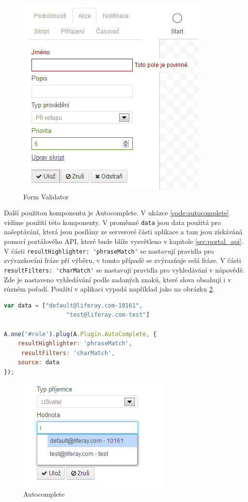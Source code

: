 \documentclass{fithesis}
\begin{document}
\begin{figure}[htp]
\centering
\includegraphics{images/validator.png}
\caption{Form Validator}
\label{fig:validator}
\end{figure}

Další použitou komponentu  je Autocomplete. V ukázce \ref{code:autocomplete} vidíme použití této komponenty. V proměnné \verb|data| jsou data použitá pro našeptávání, která jsou posílány ze serverové části aplikace a tam jsou získáváná pomocí portálového API, které bude blíže vysvětleno v kapitole \ref{sec:portal_api}. V části \verb|resultHighlighter: 'phraseMatch'| se nastavují pravidla pro zvýrazňování fráze při výběru, v tomto případě se zvýrazňuje celá fráze. V části \verb|resultFilters: 'charMatch'| se  nastavují pravidla pro vyhledávání v nápovědě. Zde je nastaveno  vyhledávání podle zadaných znaků, které slova obsahují i v různém pořadí. Použití v aplikaci vypadá například jako na obrázku \ref{fig:autocomplete}.

\begin{lstlisting}[language=JavaScript, float =h , caption = Použítí komponenty autocomplete , label = code:autocomplete ]
var data = ["default@liferay.com-10161", 
                  "test@liferay.com-test"]

A.one('#role').plug(A.Plugin.AutoComplete, {
	resultHighlighter: 'phraseMatch', 
     resultFilters: 'charMatch',
	source: data
});
\end{lstlisting}



\begin{figure}[htp]
\centering
\includegraphics{images/autocomplete.png}
\caption{Autocomplete}
\label{fig:autocomplete}
\end{figure}
\end{document}
